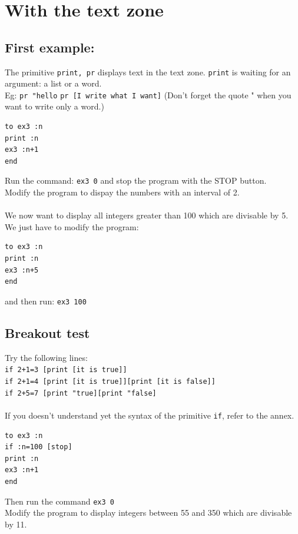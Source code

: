 \section{With the text zone}
\subsection{First example:}
\noindent The primitive \texttt{print, pr} displays text in the text zone. \texttt{print} is waiting for an argument: a list or a word.\\
 Eg: \texttt{pr "hello} \texttt{pr [I write what I want]} (Don't forget the quote " when you want to write only a word.)
\begin{verbatim}
to ex3 :n
print :n
ex3 :n+1
end
\end{verbatim}
Run the command: \texttt{ex3 0} and stop the program with the STOP button.\\
Modify the program to dispay the numbers with an interval of 2.\\
\\
We now want to display all integers greater than 100 which are divisable by 5. We just have to modify the program:
\begin{verbatim}
to ex3 :n
print :n
ex3 :n+5
end
\end{verbatim}
 and then run: \texttt{ex3 100}
\subsection{Breakout test}
\noindent Try the following lines:\\
\texttt{if 2+1=3 [print [it is true]]} \\
\texttt{if 2+1=4 [print [it is true]][print [it is false]]} \\
\texttt{if 2+5=7 [print "true][print "false]}\\
\\
If you doesn't understand yet the syntax of the primitive \texttt{if}, refer to the annex.
\begin{verbatim}
to ex3 :n
if :n=100 [stop]
print :n
ex3 :n+1
end
\end{verbatim}
Then run the command \texttt{ex3 0}\\
Modify the program to display integers between 55 and 350 which are divisable by 11.\\
